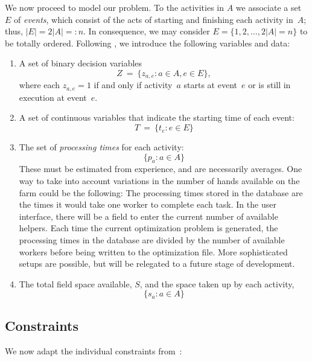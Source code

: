 \documentclass[11pt,reqno]{amsart}
\numberwithin{equation}{section}
\begin{document}
We now proceed to model our problem.  To the activities in $A$ we associate a set~$E$ of
\emph{events}, which consist of the acts of starting and finishing each activity in~$A$;
thus, $|E|=2|A|=:n$. In consequence, we may consider $E=\{1,2,\dots, 2|A|=n\}$ to be
totally ordered.  Following \cite{artigues-etal11}, we introduce the following variables
and data:

\begin{enumerate}
\item A set of binary decision variables 
  \[
     Z
     \ = \
     \big\{z_{a,e}: a\in A, e\in E\big\},
  \]
  where each $z_{a,e}=1$ if and only if activity~$a$ starts at
  event~$e$ or is still in execution at event~$e$.

\smallskip
\item A set of continuous variables that indicate the starting time of each event:
  \[
     T
     \ = \
     \big\{t_e : e\in E\big\}
  \]

\smallskip
\item The set of \emph{processing times} for each activity:
  \[
      \{p_a:a\in A\}
  \]  
  These must be estimated from experience, and are necessarily averages. One way to take
  into account variations in the number of hands available on the farm could be the
  following: The processing times stored in the database are the times it would take one
  worker to complete each task. In the user interface, there will be a field to enter the
  current number of available helpers. Each time the current optimization problem is
  generated, the processing times in the database are divided by the number of available
  workers before being written to the optimization file. More sophisticated setups are
  possible, but will be relegated to a future stage of development.

\smallskip
\item The total field space available, $S$, and the space taken up
  by each activity,
  \[
      \{s_a : a\in A\}
  \]
\end{enumerate}

\subsection{Constraints}

We now adapt the individual constraints from~\cite{artigues-etal11}:
\end{document}
